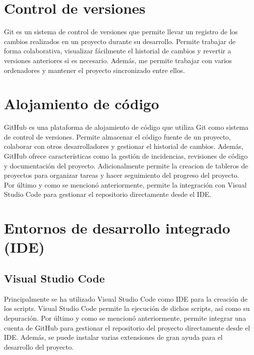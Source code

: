 
\section{Control de versiones}

Git es un sistema de control de versiones que permite llevar un registro
de los cambios realizados en un proyecto durante su desarrollo. 
Permite trabajar de forma colaborativa, visualizar fácilmente el historial de cambios y revertir a versiones anteriores si es necesario.
Además, me permite trabajar con varios ordenadores y mantener el proyecto sincronizado entre ellos.

\section{Alojamiento de código}

GitHub es una plataforma de alojamiento de código que utiliza Git como sistema de control de versiones.
Permite almacenar el código fuente de un proyecto, colaborar con otros desarrolladores y gestionar el historial de cambios.
Además, GitHub ofrece características como la gestión de incidencias, revisiones de código y documentación del proyecto.
Adicionalmente permite la creacion de tableros de proyectos para organizar tareas y hacer seguimiento del progreso del proyecto.
Por último y como se mencionó anteriormente, permite la integración con Visual Studio Code para gestionar el repositorio directamente desde el IDE.

\section{Entornos de desarrollo integrado (IDE)}

\subsection{Visual Studio Code}

Principalmente se ha utilizado Visual Studio Code como IDE para la creación de los scripts.
Visual Studio Code permite la ejecución de dichos scripts, así como su depuración.
Por último y como se mencionó anteriormente, permite integrar una cuenta de GitHub para gestionar el repositorio del proyecto directamente desde el IDE.
Además, se puede instalar varias extensiones de gran ayuda para el desarrollo del proyecto.

